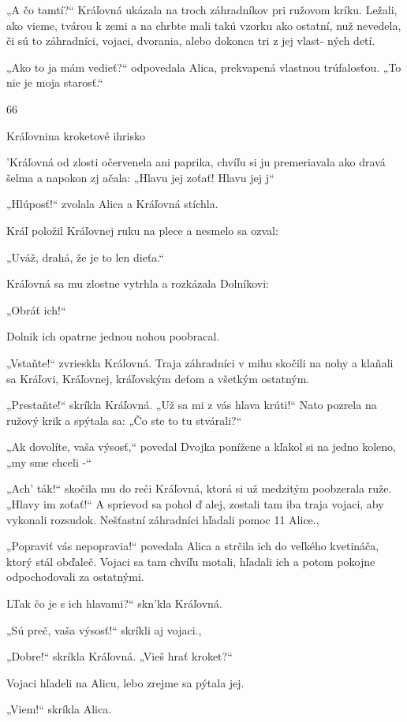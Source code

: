 \documentclass[12pt]{book}
\begin{document}
\begin{Parallel}[p]{}{}
{„A čo tamtí?“ Kráľovná ukázala na troch záhradníkov pri
ružovom kríku. Ležali, ako vieme, tvárou k zemi a na chrbte
mali takú vzorku ako ostatní, nuž nevedela, či sú to
záhradníci, vojaci, dvorania, alebo dokonca tri z jej vlast-
ných detí.

„Ako to ja mám vedieť?“ odpovedala Alica, prekvapená
vlastnou trúfalosťou. „To nie je moja starosť.“

66

Kráľovnina kroketové ihrisko

'Kráľovná od zlosti očervenela ani paprika, chvíľu si ju
premeriavala ako dravá šelma a napokon zj ačala: „Hlavu jej
zoťať! Hlavu jej j“

„Hlúposť!“ zvolala Alica a Kráľovná stíchla.

Kráľ položil Kráľovnej ruku na plece a nesmelo sa
ozval:

„Uváž, drahá, že je to len dieťa.“

Kráľovná sa mu zlostne vytrhla a rozkázala Dolníkovi:

„Obráť ich!“

Dolnik ich opatrne jednou nohou poobracal.

„Vstaňte!“ zvrieskla Kráľovná. Traja záhradníci v mihu
skočili na nohy a klaňali sa Kráľovi, Kráľovnej, kráľovským
deťom a všetkým ostatným.

„Prestaňte!“ skríkla Kráľovná. „Už sa mi z vás hlava
krúti!“ Nato pozrela na ružový krik a spýtala sa: „Čo ste to
tu stvárali?“

„Ak dovolíte, vaša výsosť,“ povedal Dvojka ponížene
a kľakol si na jedno koleno, „my sme chceli -“

„Ach' ták!“ skočila mu do reči Kráľovná, ktorá si už
medzitým poobzerala ruže. „Hlavy im zoťať!“ A sprievod sa
pohol ď alej, zostali tam iba traja vojaci, aby vykonali
rozsudok. Nešťastní záhradníci hľadali pomoc 11 Alice.,

„Popraviť vás nepopravia!“ povedala Alica a strčila ich do
veľkého kvetináča, ktorý stál obďaleč. Vojaci sa tam chvíľu
motali, hľadali ich a potom pokojne odpochodovali za
ostatnými.

LTak čo je s ich hlavami?“ skn'kla Kráľovná.

„Sú preč, vaša výsosť!“ skríkli aj vojaci.,

„Dobre!“ skríkla Kráľovná. „Vieš hrať kroket?“

Vojaci hľadeli na Alicu, lebo zrejme sa pýtala jej.

„Viem!“ skríkla Alica.

}
\end{Parallel}
\end{document}
